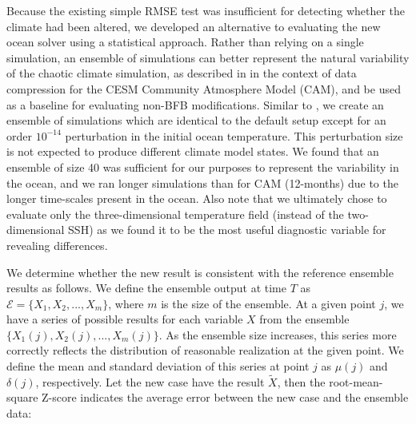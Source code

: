 Because the existing simple RMSE test was insufficient for detecting whether the climate had been altered, we developed an alternative to evaluating the new ocean solver using a statistical approach.  Rather than relying on a single simulation, an ensemble of simulations can better represent the natural variability of the chaotic climate simulation, as described in \cite{baker2014methodology} in the context of data compression for the CESM Community Atmosphere Model (CAM), and be
used as a baseline for evaluating non-BFB modifications.  Similar to \cite{baker2014methodology}, we create an ensemble of simulations which are identical to the default setup except for an order $10^{-14}$ perturbation in the initial ocean temperature. This perturbation size is not expected to produce different climate model states.  We found that an ensemble of size 40 was sufficient for our purposes to represent the variability in the ocean, and we ran longer simulations than for CAM (12-months) due to the longer time-scales present in the ocean. Also note that we ultimately chose to evaluate only the three-dimensional temperature field (instead of the two-dimensional SSH) as we found it to be the most useful diagnostic variable for revealing differences.






We determine whether the new result is consistent with the reference ensemble results as follows.
We define the ensemble output at time $T$ as $\mathcal{E}=\{X_1,X_2,...,X_m\}$, where
$m$ is the size of the ensemble.
At a given point $j$, we have a series of possible results for each variable $X$ from the ensemble $\{X_1(j),X_2(j),...,X_m(j)\}$.
As the ensemble size increases, this series more correctly reflects the distribution of reasonable realization at the given point.
We define the mean and standard deviation of this series at point $j$ as $\mu (j) $ and
$\delta (j)$, respectively.
Let the new case have the result $\tilde{X}$, 
then the root-mean-square Z-score indicates the average error between the new case and the ensemble data:

